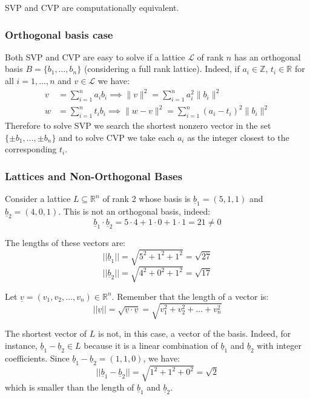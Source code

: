 \noindent
SVP and CVP are computationally equivalent.\bigskip

\subsubsection*{Orthogonal basis case}
Both SVP and CVP are easy to solve if a lattice $\mathcal{L}$ of rank $n$ has an orthogonal basis $B = \{b_1, \ldots, b_n\}$ (considering a full rank lattice). Indeed, if $a_i \in \mathbb{Z}$, $t_i \in \mathbb{R}$ for all $i = 1, \ldots, n$ and $v \in \mathcal{L}$ we have:
\begin{align*}
    v &= \sum_{i=1}^n a_i b_i \implies \|v\|^2 = \sum_{i=1}^n a_i^2 \|b_i\|^2 \\
    w &= \sum_{i=1}^n t_i b_i \implies \|w - v\|^2 = \sum_{i=1}^n (a_i - t_i)^2 \|b_i\|^2
\end{align*}
Therefore to solve SVP we search the shortest nonzero vector in the set $\{\pm b_1, \ldots, \pm b_n\}$ and to solve CVP we take each $a_i$ as the integer closest to the corresponding $t_i$.


\subsubsection*{Lattices and Non-Orthogonal Bases}

Consider a lattice $L \subseteq \mathbb{R}^n$ of rank 2 whose basis is $\underline{b}_1 = (5, 1, 1)$ and $\underline{b}_2 = (4, 0, 1)$.
This is not an orthogonal basis, indeed:
\[ \underline{b}_1 \cdot \underline{b}_2 = 5 \cdot 4 + 1 \cdot 0 + 1 \cdot 1 = 21 \neq 0 \]

The lengths of these vectors are:
\[ ||\underline{b}_1|| = \sqrt{5^2 + 1^2 + 1^2} = \sqrt{27} \]
\[ ||\underline{b}_2|| = \sqrt{4^2 + 0^2 + 1^2} = \sqrt{17} \]

Let $\underline{v} = (v_1, v_2, \dots, v_n) \in \mathbb{R}^n$. Remember that the length of a vector is:
\[ ||\underline{v}|| = \sqrt{\underline{v} \cdot \underline{v}} = \sqrt{v_1^2 + v_2^2 + \dots + v_n^2} \]

\noindent
The shortest vector of $L$ is not, in this case, a vector of the basis. Indeed, for instance, $\underline{b}_1 - \underline{b}_2 \in L$ because it is a linear combination of $\underline{b}_1$ and $\underline{b}_2$ with integer coefficients. Since $\underline{b}_1 - \underline{b}_2 = (1, 1, 0)$, we have:
\[ ||\underline{b}_1 - \underline{b}_2|| = \sqrt{1^2 + 1^2 + 0^2} = \sqrt{2} \]
which is smaller than the length of $\underline{b}_1$ and $\underline{b}_2$.
\medskip

